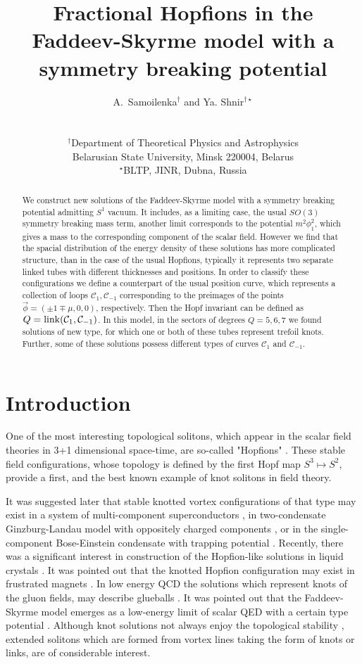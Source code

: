 \documentclass[12pt,a4paper]{article}
\title{Fractional Hopfions in the Faddeev-Skyrme model with a symmetry breaking potential}
\author{
    {\large A.~Samoilenka}$^{\dagger}$
    and {\large Ya. Shnir}$^{\dagger \star}$
    \\ \\
    \\ $^{\dagger}${\small Department of Theoretical Physics and Astrophysics}\\
    {\small Belarusian State University, Minsk 220004, Belarus}
    \\ $^{\star}${\small BLTP, JINR, Dubna, Russia}
}
\begin{document}
\maketitle

\begin{abstract}
We construct new solutions of the Faddeev-Skyrme model with a symmetry breaking potential admitting
$S^1$ vacuum. It includes, as a limiting case, the usual $SO(3)$ symmetry breaking mass term, another
limit corresponds to the potential $m^2 \phi_1^2$, which gives a mass to the corresponding
component of the scalar field.
However we find that the spacial distribution of the energy density of these solutions
has more complicated structure, than in the case of the usual Hopfions, typically it represents
two separate linked tubes with different thicknesses and positions.
In order to classify these configurations
we define a counterpart of the usual position curve, which
represents a collection of loops $\mathcal{C}_1, \mathcal{C}_{-1}$ corresponding to the preimages
of the points $\vec \phi = (\pm 1 \mp \mu, 0,0)$, respectively. Then the Hopf invariant can be defined as
$Q= {\rm link} (\mathcal{C}_1,\mathcal{C}_{-1})$. In this model, in the sectors of degrees $Q=5,6,7$
we found solutions of new type, for which one or both of these tubes represent
trefoil knots. Further, some of these solutions possess different types of curves  $\mathcal{C}_1$ and $\mathcal{C}_{-1}$.
\end{abstract}

\section{Introduction}
One of the most interesting topological solitons, which appear in the scalar
field theories in 3+1 dimensional space-time, are so-called "Hopfions"
\cite{Faddeev-Hopf,Faddeev:1996zj}.
These stable field configurations, whose topology is defined by the first Hopf map  ${S}^3 \mapsto {S}^2$,
provide a first, and the best known example of knot solitons in field theory.

It was suggested later that stable knotted vortex configurations of that type
may exist in a system of multi-component superconductors \cite{Babaev2009,Garaud:2011}, in two-condensate  Ginzburg-Landau model
with oppositely charged components \cite{Babaev:2001zy}, or in the single-component
Bose-Einstein condensate with trapping potential \cite{Kartashov:2014kva}. Recently, there was a significant interest in construction
of the Hopfion-like solutions in liquid crystals \cite{Ackerman:2017lse}.
It was pointed out that the knotted Hopfion configuration may exist in frustrated magnets
\cite{Sutcliffe:2017aro}.
In low energy QCD the solutions which represent knots of the
gluon fields, may describe glueballs \cite{Faddeev:1998eq,Faddeev:2003aw}.  It was pointed out that the
Faddeev-Skyrme model emerges as a low-energy limit
of scalar QED with a certain type potential  \cite{Gorsky:2013doa}.
Although knot solutions not always enjoy the topological stability
\cite{Speight:2008na}, extended solitons which are formed from vortex lines taking the form of knots or links,
are of considerable interest.
\end{document}
